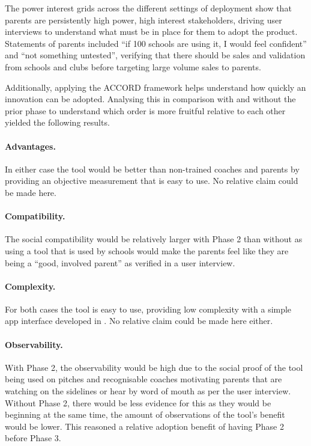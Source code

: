 The power interest grids across the different settings of deployment show that parents are persistently high power, high interest stakeholders, driving user interviews to understand what must be in place for them to adopt the product. Statements of parents included ``if 100 schools are using it, I would feel confident'' and ``not something untested'', verifying that there should be sales and validation from schools and clubs before targeting large volume sales to parents.

Additionally, applying the ACCORD framework helps understand how quickly an innovation can be adopted. Analysing this in comparison with and without the prior phase to understand which order is more fruitful relative to each other yielded the following results.

\paragraph{Advantages.} In either case the tool would be better than non-trained coaches and parents by providing an objective measurement that is easy to use. No relative claim could be made here.

\paragraph{Compatibility.} The social compatibility would be relatively larger with Phase 2 than without as using a tool that is used by schools would make the parents feel like they are being a ``good, involved parent'' as verified in a user interview.

\paragraph{Complexity.} For both cases the tool is easy to use, providing low complexity with a simple app interface developed in . No relative claim could be made here either.

\paragraph{Observability.} With Phase 2, the observability would be high due to the social proof of the tool being used on pitches and recognisable coaches motivating parents that are watching on the sidelines or hear by word of mouth as per the user interview. Without Phase 2, there would be less evidence for this as they would be beginning at the same time, the amount of observations of the tool's benefit would be lower. This reasoned a relative adoption benefit of having Phase 2 before Phase 3.

